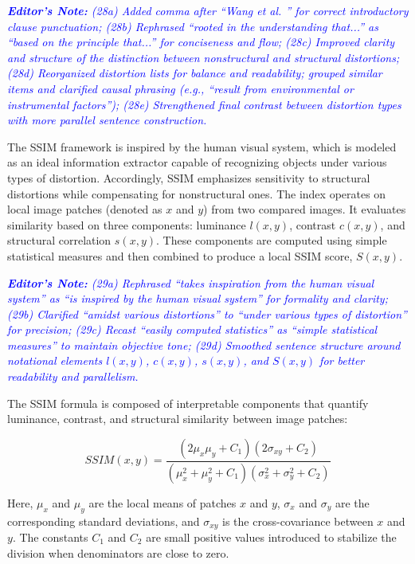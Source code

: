 \documentclass[journal,12pt,onecolumn,draftcls]{IEEEtran}
\newcommand{\editornote}[1]{\par\textit{\textcolor{blue}{\textbf{Editor's Note:} #1}}\par}
\begin{document}
\editornote{(28a) Added comma after “Wang et al. \cite{wang2009}” for correct introductory clause punctuation; 
(28b) Rephrased “rooted in the understanding that...” as “based on the principle that...” for conciseness and flow; 
(28c) Improved clarity and structure of the distinction between nonstructural and structural distortions; 
(28d) Reorganized distortion lists for balance and readability; grouped similar items and clarified causal phrasing (e.g., “result from environmental or instrumental factors”); 
(28e) Strengthened final contrast between distortion types with more parallel sentence construction.}

The SSIM framework is inspired by the human visual system, which is modeled as an ideal information extractor capable of recognizing objects under various types of distortion. Accordingly, SSIM emphasizes sensitivity to structural distortions while compensating for nonstructural ones. The index operates on local image patches (denoted as $x$ and $y$) from two compared images. It evaluates similarity based on three components: luminance $l(x, y)$, contrast $c(x, y)$, and structural correlation $s(x, y)$. These components are computed using simple statistical measures and then combined to produce a local SSIM score, $S(x, y)$.

\editornote{(29a) Rephrased “takes inspiration from the human visual system” as “is inspired by the human visual system” for formality and clarity; 
(29b) Clarified “amidst various distortions” to “under various types of distortion” for precision; 
(29c) Recast “easily computed statistics” as “simple statistical measures” to maintain objective tone; 
(29d) Smoothed sentence structure around notational elements $l(x, y)$, $c(x, y)$, $s(x, y)$, and $S(x, y)$ for better readability and parallelism.}

The SSIM formula is composed of interpretable components that quantify luminance, contrast, and structural similarity between image patches:

\begin{equation}
SSIM(x, y) = \frac{(2\mu_x\mu_y + C_1)(2\sigma_{xy} + C_2)}{(\mu_x^2 + \mu_y^2 + C_1)(\sigma_x^2 + \sigma_y^2 + C_2)}
\end{equation}

Here, $\mu_x$ and $\mu_y$ are the local means of patches $x$ and $y$, $\sigma_x$ and $\sigma_y$ are the corresponding standard deviations, and $\sigma_{xy}$ is the cross-covariance between $x$ and $y$. The constants $C_1$ and $C_2$ are small positive values introduced to stabilize the division when denominators are close to zero.
\end{document}
